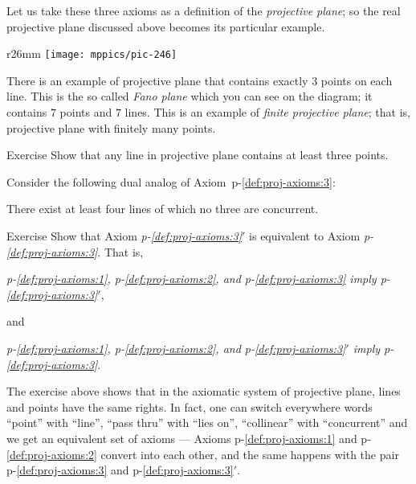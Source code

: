 Let us take these three axioms as a definition of the \emph{projective plane};
so the real projective plane discussed above becomes its particular example.

{

\begin{wrapfigure}{r}{26mm}
\vskip-0mm
\centering
\texttt{[image: mppics/pic-246]}
\end{wrapfigure}

There is an example of projective plane that contains exactly 3 points on each line.
This is the so called \emph{Fano plane} which you can see on the diagram;
it contains $7$ points and $7$ lines.
This is an example of \emph{finite projective plane};
that is, projective plane with finitely many points.

}

\begin{thm}{Exercise}\label{ex:finite-pp}
Show that any line in projective plane contains at least three points.
\end{thm}


Consider the following dual analog of Axiom~p-\ref{def:proj-axioms:3}:

\begin{framed}
There exist at least four lines of which no three are concurrent.
\end{framed}

\begin{thm}{Exercise}\label{ex:3=3'}
Show that Axiom {}\emph{p-\ref{def:proj-axioms:3}$'$} is equivalent to Axiom {}\emph{p-\ref{def:proj-axioms:3}}.
That is, 
\begin{center}
\emph{p-\ref{def:proj-axioms:1}, p-\ref{def:proj-axioms:2}, and p-\ref{def:proj-axioms:3} imply  p-\ref{def:proj-axioms:3}$'$},
\end{center}
and 
\begin{center}
\emph{p-\ref{def:proj-axioms:1}, p-\ref{def:proj-axioms:2}, and p-\ref{def:proj-axioms:3}$'$ imply p-\ref{def:proj-axioms:3}}.
\end{center}

\end{thm}

The exercise above shows that in the axiomatic system of projective plane,
lines and points have the same rights.
In fact, one can switch everywhere words ``point'' with ``line'', ``pass thru'' with ``lies on'', ``collinear'' with ``concurrent'' and we get an equivalent set of axioms ---  Axioms p-\ref{def:proj-axioms:1} and p-\ref{def:proj-axioms:2} convert into each other,
and the same happens with the pair p-\ref{def:proj-axioms:3} and p-\ref{def:proj-axioms:3}$'$.


